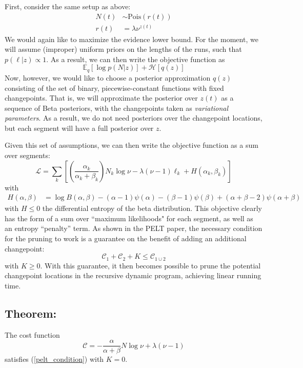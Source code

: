 \documentclass[11pt]{article}
\begin{document}
First, consider the same setup as above:
\begin{align}
    N(t) &\sim \mathrm{Pois}(r(t)) \\
    r(t) &= \lambda \nu^{z(t)}
\end{align}
We would again like to maximize the evidence lower bound. For the moment, we will assume (improper) uniform priors on the lengths of the runs, such that $p(\ell|z) \propto 1$. As a result, we can then write the objective function as 
\begin{equation}
    \mathbb{E}_q \left[\log p(N|z) \right] + \mathcal{H}[q(z)]
\end{equation}
Now, however, we would like to choose a posterior approximation $q(z)$ consisting of the set of binary, piecewise-constant functions with fixed changepoints. That is, we will approximate the posterior over $z(t)$ as a sequence of Beta posteriors, with the changepoints taken as \emph{variational parameters}. As a result, we do not need posteriors over the changepoint locations, but each segment will have a full posterior over $z$.

Given this set of assumptions, we can then write the objective function as a sum over segments:
\begin{equation}
    \mathcal{L} = \sum_k \left[ 
    \left(\frac{\alpha_k}{\alpha_k + \beta_k} \right) N_k \log \nu - \lambda (\nu - 1) \ell_k + H(\alpha_k, \beta_k)
    \right]    
\end{equation}
with 
\begin{align}
    H(\alpha, \beta) &= \log B(\alpha, \beta) - (\alpha - 1)\psi(\alpha)
    - (\beta - 1)\psi(\beta) + (\alpha + \beta - 2) \psi(\alpha + \beta)
\end{align}
with $H \le 0$ the differential entropy of the beta distribution. This objective clearly has the form of a sum over ``maximum likelihoods" for each segment, as well as an entropy ``penalty'' term. As shown in the PELT paper, the necessary condition for the pruning to work is a guarantee on the benefit of adding an additional changepoint:
\begin{equation}
    \label{pelt_condition}
    \mathcal{C}_1 + \mathcal{C}_2 + K \le \mathcal{C}_{1 \cup 2}
\end{equation}
with $K \ge 0$. With this guarantee, it then becomes possible to prune the potential changepoint locations in the recursive dynamic program, achieving linear running time.

\subsection*{Theorem:} The cost function 
\begin{equation}
    \mathcal{C} = -\frac{\alpha}{\alpha + \beta} N \log \nu + \lambda (\nu - 1)
\end{equation}
satisfies (\ref{pelt_condition}) with $K = 0$.
\end{document}
